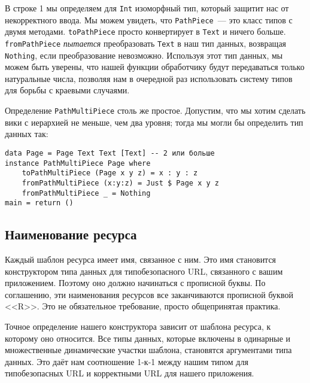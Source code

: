 В строке 1 мы определяем для \lstinline!Int! изоморфный тип, который
защитит нас от некорректного ввода. Мы можем увидеть, что
\lstinline!PathPiece!~--- это класс типов с двумя
методами. \lstinline!toPathPiece! просто конвертирует в
\lstinline!Text! и ничего больше. \lstinline!fromPathPiece!
\emph{пытается} преобразовать \lstinline!Text! в наш тип данных,
возвращая \lstinline!Nothing!, если преобразование
невозможно. Используя этот тип данных, мы можем быть уверены, что
нашей функции обработчику будут передаваться только натуральные числа,
позволяя нам в очередной раз использовать систему типов для борьбы с
краевыми случаями.


Определение \lstinline!PathMultiPiece! столь же простое. Допустим,
что мы хотим сделать вики с иерархией не меньше, чем два уровня;
тогда мы могли бы определить тип данных так:
\begin{lstlisting}
data Page = Page Text Text [Text] -- 2 или больше
instance PathMultiPiece Page where
    toPathMultiPiece (Page x y z) = x : y : z
    fromPathMultiPiece (x:y:z) = Just $ Page x y z
    fromPathMultiPiece _ = Nothing
main = return ()
\end{lstlisting}

\subsection{Наименование ресурса}
Каждый шаблон ресурса имеет имя, связанное с ним. Это имя становится
конструктором типа данных для типобезопасного URL, связанного с вашим
приложением. Поэтому оно должно начинаться с прописной буквы. По
соглашению, эти наименования ресурсов все заканчиваются прописной
буквой <<R>>. Это не обязательное требование, просто общепринятая
практика.

Точное определение нашего конструктора зависит от шаблона ресурса, к
которому оно относится. Все типы данных, которые включены в одинарные
и множественные динамические участки шаблона, становятся аргументами
типа данных. Это даёт нам соотношение 1-к-1 между нашим типом для
типобезопасных URL и корректными URL для нашего приложения.

